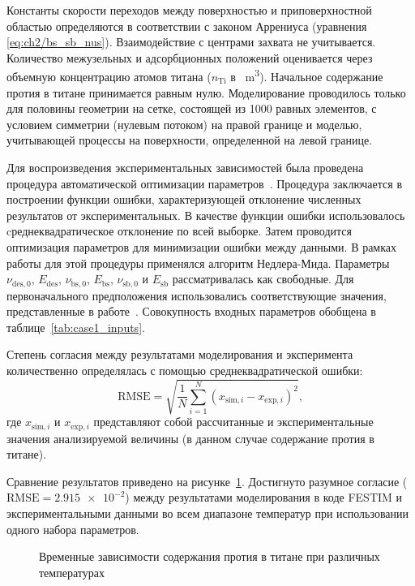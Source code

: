 Константы скорости переходов между поверхностью и приповерхностной областью определяются в соответствии с законом Аррениуса (уравнения \cref{eq:ch2/bs_sb_nus}). Взаимодействие с центрами захвата не учитывается. Количество межузельных и адсорбционных положений оценивается через объемную концентрацию атомов титана ($n_\mathrm{Ti}$ в \si{\per\meter\cubed}). Начальное содержание протия в титане принимается равным нулю. Моделирование проводилось только для половины геометрии на сетке, состоящей из 1000 равных элементов, с условием симметрии (нулевым потоком) на правой границе и моделью, учитывающей процессы на поверхности, определенной на левой границе.

Для воспроизведения экспериментальных зависимостей была проведена процедура автоматической оптимизации параметров~\cite{Delaporte-Mathurin2021}. Процедура заключается в построении функции ошибки, характеризующей отклонение численных результатов от экспериментальных. В качестве функции ошибки использовалось cреднеквадратическое отклонение по всей выборке. Затем проводится оптимизация параметров для минимизации ошибки между данными. В рамках работы для этой процедуры применялся алгоритм Недлера-Мида. Параметры $\nu_\mathrm{des,0}$, $E_\mathrm{des}$, $\nu_\mathrm{bs,0}$, $E_\mathrm{bs}$, $\nu_\mathrm{sb,0}$ и $E_\mathrm{sb}$ рассматривалась как свободные. Для первоначального предположения использовались соответствующие значения, представленные в работе~\cite{Shimohata2021}. Совокупность входных параметров обобщена в таблице~\cref{tab:case1_inputs}.

Степень согласия между результатами моделирования и эксперимента количественно определялась с помощью среднеквадратической ошибки:
\begin{equation}
    \mathrm{RMSE} = \sqrt{\dfrac{1}{N} \sum \limits_{i=1}^N(x_{\mathrm{sim},i}-x_{\mathrm{exp},i})^2},
\end{equation}
где $x_{\mathrm{sim},i}$ и $x_{\mathrm{exp},i}$ представляют собой рассчитанные и экспериментальные значения анализируемой величины (в данном случае содержание протия в титане).

Сравнение результатов приведено на рисунке~\cref{fig:ch2/val1}. Достигнуто разумное согласие (\( \mathrm{RMSE}=\num{2.915e-2} \)) между результатами моделирования в коде FESTIM и экспериментальными данными во всем диапазоне температур при использовании одного набора параметров.
\begin{figure}[ht]
    \caption{Временные зависимости содержания протия в титане при различных температурах}\label{fig:ch2/val1}
\end{figure}

